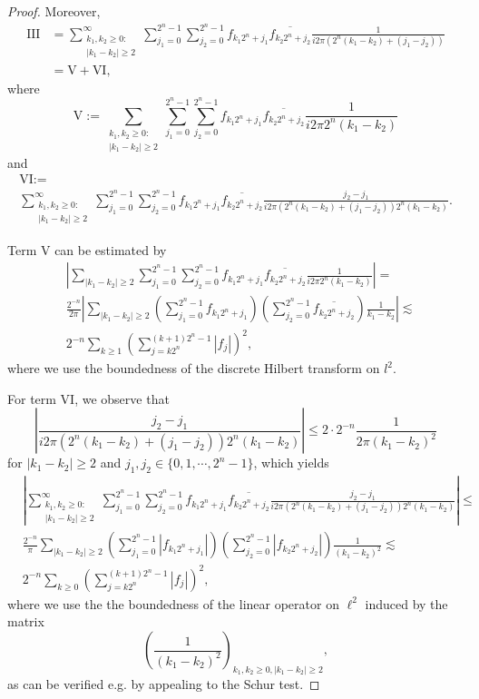 \documentclass[a4paper, leqno, 10pt]{amsart}
\numberwithin{equation}{section}
\begin{document}
\begin{proof}
Moreover,
\begin{align*}
\text{III} &= \sum_{\substack{k_1, k_2\geq 0:\\ |k_1-k_2| \geq 2}}^\infty
\sum_{j_1=0}^{2^{n}-1} \sum_{j_2=0}^{2^{n}-1} f_{k_1 2^n +j_1} \overline{f_{k_2 2^n + j_2}}  \frac{1}{i 2\pi ( 2^n (k_1-k_2) + (j_1-j_2))} \\
& = \text{V} + \text{VI},
\end{align*}
where
\[
\text{V}:= \sum_{\substack{k_1, k_2\geq 0:\\ |k_1 -k_2|\geq 2}}
\sum_{j_1=0}^{2^{n}-1} \sum_{j_2=0}^{2^{n}-1} f_{k_1 2^n +j_1} \overline{f_{k_2 2^n + j_2}}  \frac{1}{i 2\pi 2^n (k_1-k_2)} 
\]
and
\begin{multline*}
\text{VI} := \\
\sum_{\substack{ k_1, k_2\geq 0:\\ |k_1-k_2| \geq 2}}^\infty
\sum_{j_1=0}^{2^{n}-1} \sum_{j_2=0}^{2^{n}-1} f_{k_1 2^n +j_1} \overline{f_{k_2 2^n + j_2}}  \frac{j_2 -j_1}{i 2\pi ( 2^n (k_1-k_2) + (j_1-j_2)) 2^n (k_1-k_2) } .
\end{multline*}

Term V can be estimated by
\begin{align*}
& \left|\sum_{|k_1 -k_2|\geq 2}
\sum_{j_1=0}^{2^{n}-1} \sum_{j_2=0}^{2^{n}-1} f_{k_1 2^n +j_1} \overline{f_{k_2 2^n + j_2}}  \frac{1}{i 2\pi 2^n (k_1-k_2)}
\right| = \\
& \frac{2^{-n}}{2 \pi} \left|\sum_{|k_1 -k_2|\geq 2}
\left(\sum_{j_1=0}^{2^{n}-1}  f_{k_1 2^n +j_1} \right)
\left( \sum_{j_2=0}^{2^{n}-1} \overline{f_{k_2 2^n + j_2}} \right) \frac{1}{k_1-k_2}
\right|
\lesssim \\
&  2^{-n} \sum_{k \geq 1} \left(\sum_{j=k 2^{n}}^{(k+1)2^{n}-1} |f_j| \right)^2,
\end{align*}
where we use the boundedness of the discrete Hilbert transform on $l^2$.

For term $\text{VI}$, we observe that
\[
\left|\frac{j_2 -j_1}{i 2\pi ( 2^n (k_1-k_2) + (j_1-j_2))  2^n (k_1-k_2)}
 \right| \leq 2 \cdot 2^{-n} \frac{1}{2\pi  (k_1-k_2)^2}
\]
for $|k_1-k_2| \geq 2$ and $j_1, j_2 \in \{ 0, 1, \cdots, 2^n-1\}$, which yields
\begin{align*}
 & \left|\sum_{\substack{ k_1, k_2\geq 0:\\ |k_1-k_2| \geq 2}}^\infty
\sum_{j_1=0}^{2^{n}-1} \sum_{j_2=0}^{2^{n}-1} f_{k_1 2^n +j_1} \overline{f_{k_2 2^n + j_2}}  \frac{j_2 -j_1}{i 2\pi ( 2^n (k_1-k_2) + (j_1-j_2)) 2^n (k_1-k_2)   } \right| \leq \\
&   \frac{2^{-n}}{ \pi} \sum_{|k_1 -k_2|\geq 2}
\left(\sum_{j_1=0}^{2^{n}-1}  |f_{k_1 2^n +j_1} |\right)
\left( \sum_{j_2=0}^{2^{n}-1} |f_{k_2 2^n + j_2}| \right) \frac{1}{(k_1-k_2)^2}
\lesssim \\
& 2^{-n} \sum_{k \geq 0} \left(\sum_{j=k 2^{n}}^{(k+1)2^{n}-1} |f_j| \right)^2,
\end{align*}
where we use the the boundedness of the linear operator on $\ell^2$ induced by the matrix
\[
\left(\frac{1}{(k_1-k_2)^2}\right)_{k_1, k_2 \geq 0, |k_1 -k_2|\geq 2},
\]
as can be verified e.g. by appealing to the Schur test.


\end{proof}
\end{document}

